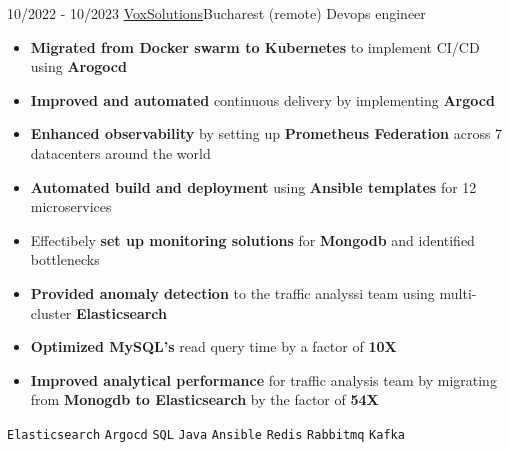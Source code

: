 \documentclass[9pt]{developercv} %
\begin{document}
\vspace{-5pt}
\begin{entrylist}
    \entry
    {10/2022 - 10/2023}
    {\href{https://voxsolutions.co/}{VoxSolutions}\newline\small\textnormal{Bucharest (remote)}}
    {Devops engineer}
    {\vspace{-6pt}
    \begin{itemize}[itemsep=2pt,topsep=0pt,parsep=0pt,partopsep=0pt, leftmargin=-1pt]
        \item{\textbf{Migrated from Docker swarm to Kubernetes} to implement CI/CD using \textbf{Arogocd}}
        \item{\textbf{Improved and automated} continuous delivery by implementing \textbf{Argocd} }
        \item{\textbf{Enhanced observability} by setting up \textbf{Prometheus Federation} across 7 datacenters around the world}
        \item{\textbf{Automated build and deployment} using \textbf{Ansible templates} for 12 microservices}
        \item{Effectibely \textbf{set up monitoring solutions} for \textbf{Mongodb} and identified bottlenecks}
        \item{\textbf{Provided anomaly detection} to the traffic analyssi team using multi-cluster \textbf{Elasticsearch}}
        \item{\textbf{Optimized MySQL's} read query time by a factor of \textbf{10X}}
        \item{\textbf{Improved analytical performance}  for traffic analysis team by migrating from \textbf{Monogdb to Elasticsearch} by the factor of \textbf{54X}}
    \end{itemize}
    {\vspace{2pt}}
    \texttt{Elasticsearch} \slashsep \texttt{Argocd} \slashsep \texttt{SQL} \slashsep \texttt{Java} \slashsep \texttt{Ansible} \slashsep \texttt{Redis} \slashsep \texttt{Rabbitmq} \slashsep \texttt{Kafka}}
\end{entrylist}
\begin{center}
    \hdashrule[0.2ex]{\linewidth}{0.5pt}{.8mm}
\end{center}
\vspace{5pt}
\end{document}
